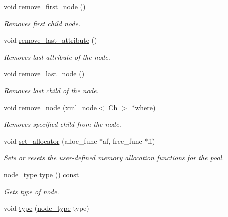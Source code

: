 \begin{DoxyCompactItemize}
void \mbox{\hyperlink{classrapidxml_1_1xml__node_a9a31d861e1bddc710839c551a5d2b3a4}{remove\+\_\+first\+\_\+node}} ()
\begin{DoxyCompactList}\small\item\em Removes first child node. \end{DoxyCompactList}\item 
void \mbox{\hyperlink{classrapidxml_1_1xml__node_a37d87c4d5d89fa0cf05b72ee8d4cba3b}{remove\+\_\+last\+\_\+attribute}} ()
\begin{DoxyCompactList}\small\item\em Removes last attribute of the node. \end{DoxyCompactList}\item 
void \mbox{\hyperlink{classrapidxml_1_1xml__node_a87addf2bc127ee31aa4b5295d3c9b530}{remove\+\_\+last\+\_\+node}} ()
\begin{DoxyCompactList}\small\item\em Removes last child of the node. \end{DoxyCompactList}\item 
void \mbox{\hyperlink{classrapidxml_1_1xml__node_a9316463a2201631e7e2062b17729f9cd}{remove\+\_\+node}} (\mbox{\hyperlink{classrapidxml_1_1xml__node}{xml\+\_\+node}}$<$ Ch $>$ $\ast$where)
\begin{DoxyCompactList}\small\item\em Removes specified child from the node. \end{DoxyCompactList}\item 
void \mbox{\hyperlink{classrapidxml_1_1memory__pool_ac0a55a6ef0837dca67572e357100d78a}{set\+\_\+allocator}} (alloc\+\_\+func $\ast$af, free\+\_\+func $\ast$ff)
\begin{DoxyCompactList}\small\item\em Sets or resets the user-\/defined memory allocation functions for the pool. \end{DoxyCompactList}\item 
\mbox{\hyperlink{namespacerapidxml_a6a276b85e2da28c5f9c3dbce61c55682}{node\+\_\+type}} \mbox{\hyperlink{classrapidxml_1_1xml__node_a026a603e420a2e3e7ab820cfbd1a7e97}{type}} () const
\begin{DoxyCompactList}\small\item\em Gets type of node. \end{DoxyCompactList}\item 
void \mbox{\hyperlink{classrapidxml_1_1xml__node_aa78759bfa429fa2ab6bc5fe617cfa3cf}{type}} (\mbox{\hyperlink{namespacerapidxml_a6a276b85e2da28c5f9c3dbce61c55682}{node\+\_\+type}} type)

\end{DoxyCompactItemize}
